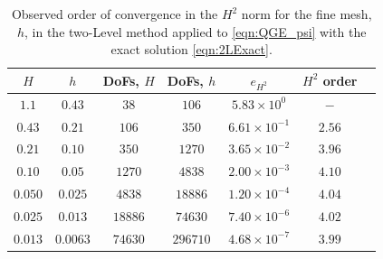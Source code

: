 \begin{table}
  \begin{center}
    \begin{tabular}{|c|c|c|c|c|c|c|}
    \hline
      $H$ &   $h$  &  DoFs, $ H $ & DoFs, $ h $ & $e_{H^2}$ & $H^2$ order \\
      \hline
      $1.1$ & $0.43$ & $38$ & $106$ & $5.83\times 10^0$ & $-$ \\[0.2em]
      $0.43$ & $0.21$ & $106$ & $350$ & $6.61\times 10^{-1}$ & $2.56$ \\[0.2em]
      $0.21$ & $0.10$ & $350$ & $1270$ & $3.65\times 10^{-2}$ & $3.96$ \\[0.2em]
      $0.10$ & $0.05$ & $1270$ & $4838$ & $2.00 \times 10^{-3}$ & $4.10$ \\[0.2em]
      $0.050$ & $0.025$ & $4838$ & $18886$ & $1.20\times 10^{-4}$ & $4.04$ \\[0.2em]
      $0.025$ & $0.013$ & $18886$ & $74630$ & $7.40\times 10^{-6}$ & $4.02$ \\[0.2em]
      $0.013$ & $0.0063$ & $74630$ & $296710$ & $4.68\times 10^{-7}$ & $3.99$ \\[0.2em]
    \hline
    \end{tabular}
  \end{center}
  \caption{Observed order of convergence in the $H^2$ norm for the fine mesh,
    $h$, in the two-Level method applied to \eqref{eqn:QGE_psi} with the exact
    solution \eqref{eqn:2LExact}.}
  \label{tab:TwoLevelh}
\end{table}

